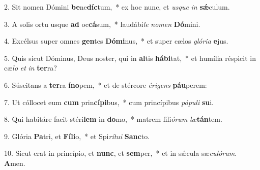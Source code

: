 2. Sit nomen Dómini \textbf{be}ne\textbf{díc}tum,~*  ex hoc nunc, et \textit{us}\textit{que} \textit{in} \textbf{sǽ}culum.\

3. A solis ortu usque \textbf{ad} oc\textbf{cá}sum,~*  laudábi\textit{le} \textit{no}\textit{men} \textbf{Dó}mini.\

4. Excélsus super omnes \textbf{gen}tes \textbf{Dó}\textbf{mi}nus,~*  et super cælos \textit{gló}\textit{ri}\textit{a} \textbf{e}jus.\

5. Quis sicut Dóminus, Deus noster, qui in \textbf{al}tis \textbf{há}\textbf{bi}tat,~*  et humília réspicit in cæ\textit{lo} \textit{et} \textit{in} \textbf{ter}ra?\

6. Súscitans a \textbf{ter}ra \textbf{ín}\textbf{o}pem,~*  et de stércore \textit{é}\textit{ri}\textit{gens} \textbf{páu}perem:\

7. Ut cóllocet eum \textbf{cum} prin\textbf{cí}\textbf{pi}bus,~*  cum princípibus \textit{pó}\textit{pu}\textit{li} \textbf{su}i.\

8. Qui habitáre facit stéri\textbf{lem} in \textbf{do}mo,~*  matrem fili\textit{ó}\textit{rum} \textit{læ}\textbf{tán}tem.\

9. Glória \textbf{Pa}tri, et \textbf{Fí}\textbf{li}o,~*  et Spi\textit{rí}\textit{tu}\textit{i} \textbf{Sanc}to.\

10. Sicut erat in princípio, et \textbf{nunc}, et \textbf{sem}per,~*  et in sǽcula sæ\textit{cu}\textit{ló}\textit{rum}. \textbf{A}men.\

